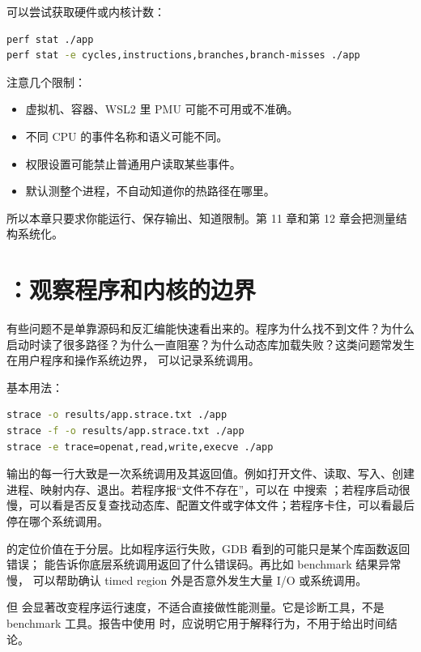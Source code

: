  可以尝试获取硬件或内核计数：

\begin{lstlisting}[language=bash]
perf stat ./app
perf stat -e cycles,instructions,branches,branch-misses ./app
\end{lstlisting}

注意几个限制：

\begin{itemize}
  \item 虚拟机、容器、WSL2 里 PMU 可能不可用或不准确。
  \item 不同 CPU 的事件名称和语义可能不同。
  \item 权限设置可能禁止普通用户读取某些事件。
  \item {} 默认测整个进程，不自动知道你的热路径在哪里。
\end{itemize}

所以本章只要求你能运行、保存输出、知道限制。第 11 章和第 12 章会把测量结构系统化。

\section{：观察程序和内核的边界}

有些问题不是单靠源码和反汇编能快速看出来的。程序为什么找不到文件？为什么启动时读了很多路径？为什么一直阻塞？为什么动态库加载失败？这类问题常发生在用户程序和操作系统边界， 可以记录系统调用。

基本用法：

\begin{lstlisting}[language=bash]
strace -o results/app.strace.txt ./app
strace -f -o results/app.strace.txt ./app
strace -e trace=openat,read,write,execve ./app
\end{lstlisting}

 输出的每一行大致是一次系统调用及其返回值。例如打开文件、读取、写入、创建进程、映射内存、退出。若程序报“文件不存在”，可以在  中搜索 ；若程序启动很慢，可以看是否反复查找动态库、配置文件或字体文件；若程序卡住，可以看最后停在哪个系统调用。

 的定位价值在于分层。比如程序运行失败，GDB 看到的可能只是某个库函数返回错误； 能告诉你底层系统调用返回了什么错误码。再比如 benchmark 结果异常慢， 可以帮助确认 timed region 外是否意外发生大量 I/O 或系统调用。

但  会显著改变程序运行速度，不适合直接做性能测量。它是诊断工具，不是 benchmark 工具。报告中使用  时，应说明它用于解释行为，不用于给出时间结论。

